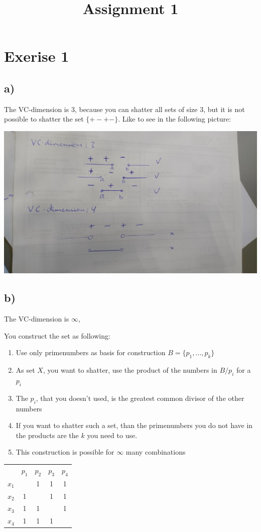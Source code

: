 \documentclass{article}
\title{Assignment 1}
\begin{document}
 \setlength{\parindent}{0em}

\section*{Exerise 1}
\subsection*{a)}
The VC-dimension is 3, because you can shatter all sets of size 3, but it is not
possible to shatter the set $\{+-+-\}$. Like to see in the following picture:

\includegraphics[width=.6\linewidth]{1a.jpg}

\subsection*{b)}

The VC-dimension is $\infty$, 

You construct the set as following:
\begin{enumerate}
  \item Use only primenumbers as basis for construction $B=\{p_1,\ldots,p_k\}$
  \item As set $X$, you want to shatter, use the product of the numbers in
  $B/p_i$ for a $p_i$
  \item The $p_i$, that you doesn't used, is the greatest common divisor of the
  other numbers
  \item If you want to shatter such a set, than the primenumbers you do not have
  in the products are the $k$ you need to use.
  \item This construction is possible for $\infty$ many combinations
\end{enumerate}
\begin{tabular}{|c|c|c|c|c|}
	  &$p_1$ &$p_2$ &$p_3$ &$p_4$\\
$x_1$ &		 &1		&1	   &1\\
$x_2$ &1	 &		&1	   &1\\
$x_3$ &1	 &1		&	   &1\\
$x_4$ &1	 &1		&1	   & \\
\end{tabular}
\end{document}
